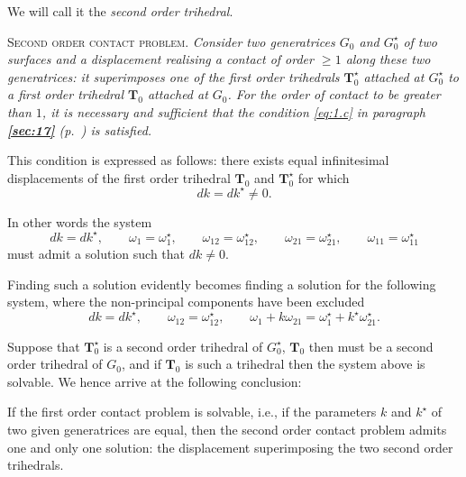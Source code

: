 \documentclass[leqno,11pt]{book}
\numberwithin{equation}{chapter}
\theoremstyle{shape1}
\theoremstyle{shapesmall}
\newcommand{\fsref}[1]{{\rm\textsection\textbf{\ref{sec:#1}}}}
\newcommand{\str}{^{\star}}
\newcommand{\somespace}{\vspace{9pt}}
\begin{document}
We will call it the \emph{second order trihedral}.

\somespace

\textsc{Second order contact problem.} \emph{Consider two generatrices $G_{0}$ and $G_{0}\str$ of two surfaces and a displacement realising a contact of order $\ge 1$ along these two generatrices: it superimposes one of the first order trihedrals $\mathbf{T}\str_{0}$ attached at $G_{0}\str$ to a first order trihedral $\mathbf{T}_{0}$ attached at $G_{0}$. For the order of contact to be greater than $1$, it is necessary and sufficient that the condition \eqref{eq:1.c} in paragraph \emph{\fsref{17} (p.~\pageref{eq:1.c})} is satisfied.}

\somespace

This condition is expressed as follows: there exists equal infinitesimal displacements of the first order trihedral $\mathbf{T}_{0}$ and $\mathbf{T}_{0}\str$ for which
\[
dk=dk\str\neq 0.
\]

In other words the system
\[
dk=dk\str,\qquad\omega_{1}=\omega_{1}\str,\qquad\omega_{12}=\omega_{12}\str,\qquad\omega_{21}=\omega_{21}\str,\qquad\omega_{11}=\omega_{11}\str
\]
must admit a solution such that $dk\neq 0$.

Finding such a solution evidently becomes finding a solution for the following system, where the non-principal components have been excluded
\[
dk=dk\str,\qquad\omega_{12}=\omega_{12}\str,\qquad\omega_{1}+k\omega_{21}=\omega_{1}\str+k\str\omega_{21}\str.
\]

Suppose that $\mathbf{T}_{0}\str$ is a second order trihedral of $G_{0}\str$, $\mathbf{T}_{0}$ then must be a second order trihedral of $G_{0}$, and if $\mathbf{T}_{0}$ is such a trihedral then the system above is solvable. We hence arrive at the following conclusion:

If the first order contact problem is solvable, i.e., if the parameters $k$ and $k\str$ of two given generatrices are equal, then the second order contact problem admits one and only one solution: the displacement superimposing the two second order trihedrals.
\end{document}
